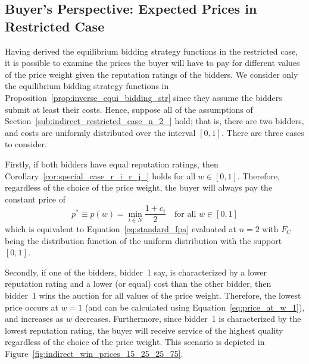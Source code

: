 \subsection{Buyer's Perspective: Expected Prices in Restricted Case} %
\label{sub:buyer_s_perspective_expected_prices_in_restricted_case}
Having derived the equilibrium bidding strategy functions in the restricted case, it is possible to examine the prices the buyer will have to pay for different values of the price weight given the reputation ratings of the bidders. We consider only the equilibrium bidding strategy functions in Proposition~\ref{prop:inverse_equi_bidding_str} since they assume the bidders submit at least their costs. Hence, suppose all of the assumptions of Section~\ref{sub:indirect_restricted_case_n_2_} hold; that is, there are two bidders, and costs are uniformly distributed over the interval $[0,1]$. There are three cases to consider.

Firstly, if both bidders have equal reputation ratings, then Corollary~\ref{cor:special_case_r_i_r_j_} holds for all $w\in [0,1]$. Therefore, regardless of the choice of the price weight, the buyer will always pay the constant price of
\begin{equation}
  \label{eq:price_at_w_1}
  p^* \equiv p(w) = \min_{i\in N} \frac{1+c_i}{2} \quad\text{for all }w\in [0,1]
\end{equation}
which is equivalent to Equation~\eqref{eq:standard_fpa} evaluated at $n=2$ with $F_C$ being the distribution function of the uniform distribution with the support $[0,1]$.

Secondly, if one of the bidders, bidder~1 say, is characterized by a lower reputation rating and a lower (or equal) cost than the other bidder, then bidder~1 wins the auction for all values of the price weight. Therefore, the lowest price occurs at $w=1$ (and can be calculated using Equation~\eqref{eq:price_at_w_1}), and increases as $w$ decreases. Furthermore, since bidder~1 is characterized by the lowest reputation rating, the buyer will receive service of the highest quality regardless of the choice of the price weight. This scenario is depicted in Figure~\ref{fig:indirect_win_prices_15_25_25_75}.

